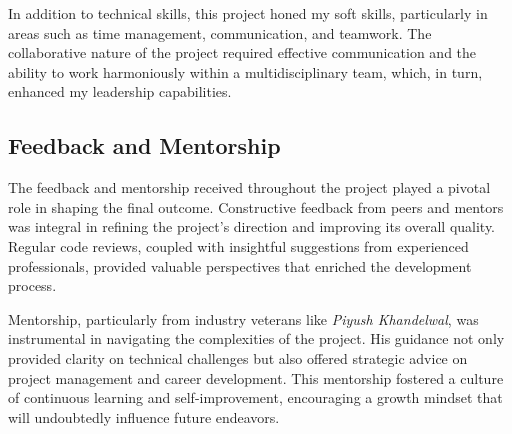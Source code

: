 In addition to technical skills, this project honed my soft skills, particularly in areas such as time management, communication, and teamwork. The collaborative nature of the project required effective communication and the ability to work harmoniously within a multidisciplinary team, which, in turn, enhanced my leadership capabilities.

\subsection{Feedback and Mentorship}
The feedback and mentorship received throughout the project played a pivotal role in shaping the final outcome. Constructive feedback from peers and mentors was integral in refining the project’s direction and improving its overall quality. Regular code reviews, coupled with insightful suggestions from experienced professionals, provided valuable perspectives that enriched the development process.

Mentorship, particularly from industry veterans like \textit{Piyush Khandelwal}, was instrumental in navigating the complexities of the project. His guidance not only provided clarity on technical challenges but also offered strategic advice on project management and career development. This mentorship fostered a culture of continuous learning and self-improvement, encouraging a growth mindset that will undoubtedly influence future endeavors.


